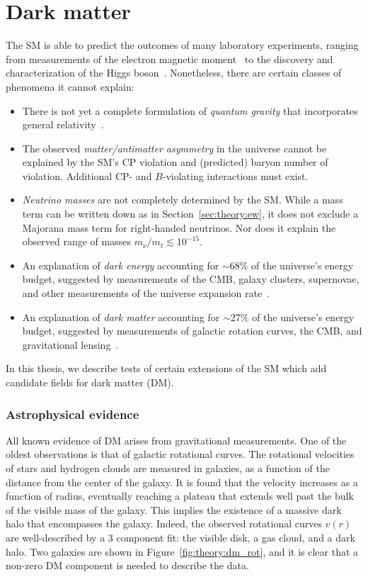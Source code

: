 \section{Dark matter}

The SM is able to predict the outcomes of many laboratory experiments, ranging from measurements of the electron magnetic moment~\cite{eedm} to the discovery and characterization of the Higgs boson~\cite{higgsdisc,higgsprop}.
Nonetheless, there are certain classes of phenomena it cannot explain:
\begin{itemize}
    \item There is not yet a complete formulation of \emph{quantum gravity} that incorporates general relativity~\cite{gr}.
    \item The observed \emph{matter/antimatter asymmetry} in the universe cannot be explained by the SM's CP violation and (predicted) baryon number of violation. 
          Additional CP- and $B$-violating interactions must exist.
    \item \emph{Neutrino masses} are not completely determined by the SM. 
            While a mass term can be written down as in Section~\ref{sec:theory:ew}, it does not exclude a Majorana mass term for right-handed neutrinos. 
            Nor does it explain the observed range of masses $m_\nu/m_t \lesssim 10^{-15}$. 
    \item An explanation of \emph{dark energy} accounting for $\sim 68\%$ of the universe's energy budget, suggested by measurements of the CMB, galaxy clusters, supernovae, and other measurements of the universe expansion rate~\cite{darkenergy}.
    \item An explanation of \emph{dark matter} accounting for $\sim 27\%$ of the universe's energy budget, suggested by measurements of galactic rotation curves, the CMB, and gravitational lensing~\cite{pdg,dm1,dm2,dm3}.
\end{itemize}
In this thesis, we describe tests of certain extensions of the SM which add candidate fields for dark matter (DM). 

\subsubsection{Astrophysical evidence}
All known evidence of DM arises from gravitational measurements.
One of the oldest observations is that of galactic rotational curves.
The rotational velocities of stars and hydrogen clouds are measured in galaxies, as a function of the distance from the center of the galaxy.
It is found that the velocity increases as a function of radius, eventually reaching a plateau that extends well past the bulk of the visible mass of the galaxy.
This implies the existence of a massive dark halo that encompasses the galaxy.
Indeed, the observed rotational curves $v(r)$ are well-described by a 3 component fit: the visible disk, a gas cloud, and a dark halo. 
Two galaxies are shown in Figure~\ref{fig:theory:dm_rot}, and it is clear that a non-zero DM component is needed to describe the data.

